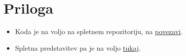 \documentclass[titlepage]{article}
\begin{document}
\section{Priloga}
\begin{itemize}
  \item Koda je na voljo na spletnem repozitoriju, na \href{https://github.com/MAZI2/Ray-tracing-non-euclidean-spaces}{povezavi}.
  \item Spletna predstavitev pa je na voljo \href{https://docs.google.com/presentation/d/1NP8gkPzV8rE2ToBoUAP4b7w2yMkAWgCmlsRPMn_5Ahc/edit?usp=sharing}{tukaj}.
\end{itemize}
\end{document}
